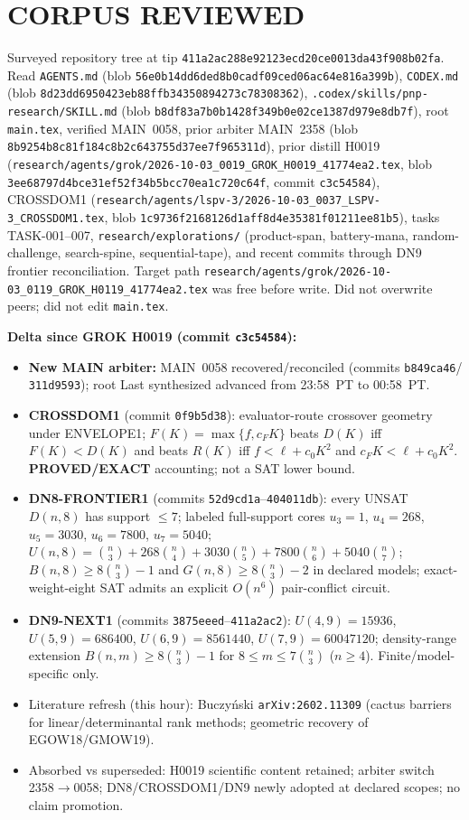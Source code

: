 \documentclass[11pt]{article}
\begin{document}
\section*{CORPUS REVIEWED}
Surveyed repository tree at tip \texttt{411a2ac288e92123ecd20ce0013da43f908b02fa}.
Read \texttt{AGENTS.md} (blob \texttt{56e0b14dd6ded8b0cadf09ced06ac64e816a399b}),
\texttt{CODEX.md} (blob \texttt{8d23dd6950423eb88ffb34350894273c78308362}),
\texttt{.codex/skills/pnp-research/SKILL.md} (blob
\texttt{b8df83a7b0b1428f349b0e02ce1387d979e8db7f}), root \texttt{main.tex},
verified MAIN~0058, prior arbiter MAIN~2358 (blob
\texttt{8b9254b8c81f184c8b2c643755d37ee7f965311d}), prior distill H0019
(\texttt{research/agents/grok/2026-10-03\_0019\_GROK\_H0019\_41774ea2.tex}, blob
\texttt{3ee68797d4bce31ef52f34b5bcc70ea1c720c64f}, commit \texttt{c3c54584}),
CROSSDOM1
(\texttt{research/agents/lspv-3/2026-10-03\_0037\_LSPV-3\_CROSSDOM1.tex}, blob
\texttt{1c9736f2168126d1aff8d4e35381f01211ee81b5}), tasks TASK-001--007,
\texttt{research/explorations/} (product-span, battery-mana, random-challenge,
search-spine, sequential-tape), and recent commits through DN9 frontier
reconciliation. Target path
\texttt{research/agents/grok/2026-10-03\_0119\_GROK\_H0119\_41774ea2.tex}
was free before write. Did not overwrite peers; did not edit \texttt{main.tex}.

\textbf{Delta since GROK H0019 (commit \texttt{c3c54584}):}
\begin{itemize}
\item \textbf{New MAIN arbiter:} MAIN~0058 recovered/reconciled (commits
\texttt{b849ca46}/\\\texttt{311d9593}); root Last synthesized advanced from
23:58~PT to 00:58~PT.
\item \textbf{CROSSDOM1} (commit \texttt{0f9b5d38}): evaluator-route crossover
geometry under ENVELOPE1; $F(K)=\max\{f,c_FK\}$ beats $D(K)$ iff
$F(K)<D(K)$ and beats $R(K)$ iff $f<\ell+c_0K^2$ and $c_FK<\ell+c_0K^2$.
\textbf{PROVED/EXACT} accounting; not a SAT lower bound.
\item \textbf{DN8-FRONTIER1} (commits \texttt{52d9cd1a}--\texttt{404011db}):
every UNSAT $D(n,8)$ has support $\le 7$; labeled full-support cores
$u_3=1$, $u_4=268$, $u_5=3030$, $u_6=7800$, $u_7=5040$;
$U(n,8)=\binom{n}{3}+268\binom{n}{4}+3030\binom{n}{5}+7800\binom{n}{6}+5040\binom{n}{7}$;
$B(n,8)\ge 8\binom{n}{3}-1$ and $G(n,8)\ge 8\binom{n}{3}-2$ in declared models;
exact-weight-eight SAT admits an explicit $O(n^6)$ pair-conflict circuit.
\item \textbf{DN9-NEXT1} (commits \texttt{3875eeed}--\texttt{411a2ac2}):
$U(4,9)=15936$, $U(5,9)=686400$, $U(6,9)=8561440$, $U(7,9)=60047120$;
density-range extension $B(n,m)\ge 8\binom{n}{3}-1$ for
$8\le m\le 7\binom{n}{3}$ ($n\ge 4$). Finite/model-specific only.
\item Literature refresh (this hour): Buczy\'nski \texttt{arXiv:2602.11309}
(cactus barriers for linear/determinantal rank methods; geometric recovery of
EGOW18/GMOW19).
\item Absorbed vs superseded: H0019 scientific content retained; arbiter switch
2358$\to$0058; DN8/CROSSDOM1/DN9 newly adopted at declared scopes; no claim
promotion.
\end{itemize}
\end{document}
